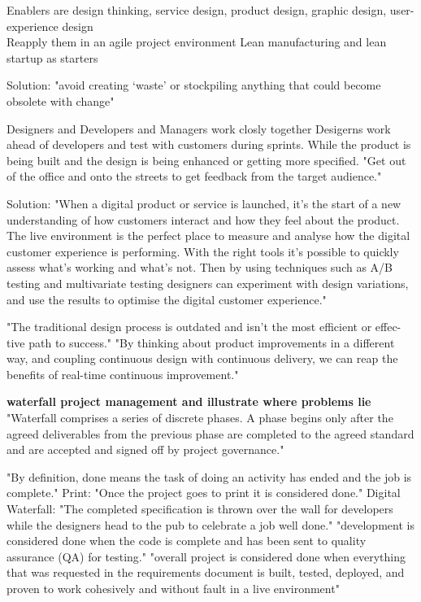 Enablers are design thinking, service design, product design, graphic design, user-experience design\\
Reapply them in an agile project environment \citep{ratcliffe2011agile:12}
Lean manufacturing and lean startup as starters

Solution: "avoid creating `waste' or stockpiling anything that could become obsolete with change" \citep{ratcliffe2011agile:12} 

Designers and Developers and Managers work closly together
Desigerns work ahead of developers and test with customers during sprints.
While the product is being built and the design is being enhanced or getting more specified.
"Get out of the office and onto the streets to get feedback from the target audience." \citep{ratcliffe2011agile:13}

Solution: "When a digital product or service is launched, it’s the start of a new understanding of how customers interact and how they feel about the product. The live environment is the perfect place to measure and analyse how the digital customer experience is performing. With the right tools it’s possible to quickly assess what’s working and what’s not. Then by using techniques such as A/B testing and multivariate testing designers can experiment with design variations, and use the results to optimise the digital customer experience." \citep{ratcliffe2011agile:14}

"The traditional design process is outdated and isn’t the most efficient or effec- tive path to success." \citep{ratcliffe2011agile:14}
"By thinking about product improvements in a different way, and coupling continuous design with continuous delivery, we can reap the benefits of real-time continuous improvement." \citep{ratcliffe2011agile:14}


\textbf{waterfall project management and illustrate where problems lie}
"Waterfall comprises a series of discrete phases. A phase begins only after the agreed deliverables from the previous phase are completed to the agreed standard and are accepted and signed off by project governance." \citep{ratcliffe2011agile:18}

"By definition, done means the task of doing an activity has ended and the job is complete." \citep{ratcliffe2011agile:18}
Print: 
"Once the project goes to print it is considered done." \citep{ratcliffe2011agile:18}
Digital Waterfall: 
"The completed specification is thrown over the wall for developers while the designers head to the pub to celebrate a job well done." \citep{ratcliffe2011agile:19}
"development is considered done when the code is complete and has been sent to quality assurance (QA) for testing." \citep{ratcliffe2011agile:19}
"overall project is considered done when everything that was requested in the requirements document is built, tested, deployed, and proven to work cohesively and without fault in a live environment" \citep{ratcliffe2011agile:19}

